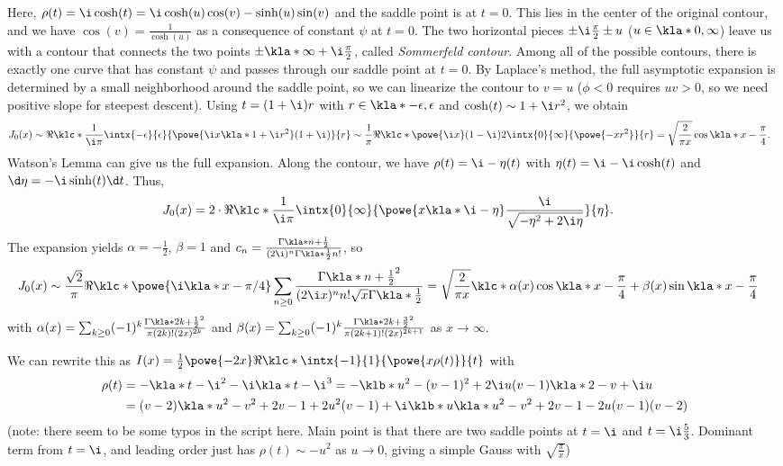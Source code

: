 \documentclass[english, parskip=full]{scrbook}
\newcommand{\example}[3]{\begin{tcolorbox}[colback=colorbackgroundexample,colframe=colorexample, breakable,enhanced,title={\textbf{#1}: #2.}]#3\end{tcolorbox}}
\begin{document}
\example{Bessel Function}{$J_0(x) = \Re \klc*{\frac{1}{\i \pi} \intx{-\i\pi/2}{\i\pi/2}{\powe{\i x\cosh(t)}}{t}}$ as $x\rightarrow\infty$}{Here, $\rho(t)=\i\cosh(t) = \i\cosh(u)\cos(v) - \sinh(u)\sin(v)$ and the saddle point is at $t=0$.
This lies in the center of the original contour, and we have $\cos(v) = \frac{1}{\cosh(u)}$ as a consequence of constant $\psi$ at $t=0$.
The two horizontal pieces $\pm\i \frac{\pi}{2} \pm u$ ($u\in\kla*{0,\infty}$) leave us with a contour that connects the two points $\pm \kla*{\infty + \i \frac{\pi}{2}}$, called \emph{Sommerfeld contour}.
Among all of the possible contours, there is exactly one curve that has constant $\psi$ and passes through our saddle point at $t=0$.
By Laplace's method, the full asymptotic expansion is determined by a small neighborhood around the saddle point, so we can linearize the contour to $v=u$ ($\phi<0$ requires $uv>0$, so we need positive slope for steepest descent).
Using $t=(1+\i)r$ with $r\in\kla*{-\epsilon,\epsilon}$ and $\cosh(t)\sim 1 + \i r^2$, we obtain
\begin{align}
J_0(x) &\sim \Re \klc*{\frac{1}{\i\pi} \intx{-\epsilon}{\epsilon}{\powe{\i x \kla*{1+\i r^2}}(1+\i)}{r}} \sim \frac{1}{\pi} \Re \klc*{\powe{\i x}(1-\i)} 2\intx{0}{\infty}{\powe{-xr^2}}{r} = \sqrt{\frac{2}{\pi x}} \cos\kla*{x-\frac{\pi}{4}}.
\end{align}
Watson's Lemma can give us the full expansion.
Along the contour, we have $\rho(t)=\i - \eta(t)$ with $\eta(t)=\i-\i\cosh(t)$ and $\d\eta=-\i\sinh(t)\d t$.
Thus,
\begin{align}
J_0(x) &= 2\cdot \Re\klc*{\frac{1}{\i\pi} \intx{0}{\infty}{\powe{x\kla*{\i - \eta}} \frac{\i}{\sqrt{-\eta^2+2\i\eta}}}{\eta}}.
\end{align}
The expansion yields $\alpha = -\frac{1}{2}$, $\beta=1$ and $c_n=\frac{\Gamma\kla*{n+\frac{1}{2}}}{(2\i)^n \Gamma\kla*{\frac{1}{2}} n!}$, so
\begin{align}
J_0(x) &\sim \frac{\sqrt{2}}{\pi} \Re 
\klc*{\powe{\i \kla*{x-\pi/4}} \sum_{n\ge 0} \frac{\Gamma\kla*{n+\frac{1}{2}}^2}{(2\i x)^n n! \sqrt{x} \Gamma\kla*{\frac{1}{2}}}} = \sqrt{\frac{2}{\pi x}} \klc*{\alpha(x) \cos\kla*{x-\frac{\pi}{4}} + \beta(x) \sin\kla*{x-\frac{\pi}{4}}}
\end{align}
with $\alpha(x) = \sum_{k\ge 0} (-1)^k \frac{\Gamma\kla*{2k+\frac{1}{2}}^2}{\pi (2k)!(2x)^{2k}} $ and $\beta(x) = \sum_{k\ge 0} (-1)^k \frac{\Gamma\kla*{2k+\frac{3}{2}}^2}{\pi (2k+1)!(2x)^{2k+1}}$ as $x\rightarrow\infty$.
}
\example{Trigonometric Gauss integral}{$I(x)=\intx{0}{1}{\powe{-4xt^2} \cos\kla*{5xt-xt^3}}{t}$ as $x\rightarrow\infty$}{We can rewrite this as $I(x)=\frac{1}{2} \powe{-2x} \Re \klc*{\intx{-1}{1}{\powe{x\rho(t)}}{t}}$ with
\begin{align}
\rho(t) &= -\kla*{t-\i}^2-\i \kla*{t-\i}^3 = -\klb*{u^2-(v-1)^2 + 2\i u(v-1)} \kla*{2-v + \i u}\\
&= (v-2)\kla*{u^2-v^2+2v-1} + 2u^2(v-1) + \i \klb*{u\kla*{u^2-v^2+2v-1} - 2u(v-1)(v-2)}
\end{align}
(note: there seem to be some typos in the script here. Main point is that there are two saddle points at $t=\i$ and $t=\i \frac{5}{3}$. Dominant term from $t=\i$, and leading order just has $\rho(t)\sim -u^2$ as $u\rightarrow 0$, giving a simple Gauss with $\sqrt{\frac{\pi}{x}}$)
}
\end{document}
